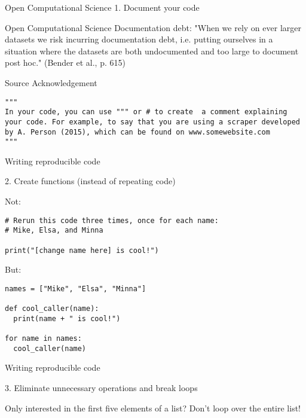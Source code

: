 \documentclass[compress]{beamer}
\begin{document}
\begin{frame}{Open Computational Science}
1. Document your code
\end{frame}

\begin{frame}{Open Computational Science}
Documentation debt: "When we rely on ever larger datasets we risk incurring documentation debt, i.e. putting ourselves in a situation where the datasets are both undocumented and too large to document post hoc." (Bender et al., p. 615)
	
\end{frame}

\begin{frame}[fragile]{Source Acknowledgement}
	
\begin{lstlisting}		
"""
In your code, you can use """ or # to create  a comment explaining your code. For example, to say that you are using a scraper developed by A. Person (2015), which can be found on www.somewebsite.com
"""
\end{lstlisting}
\end{frame}


\begin{frame}[fragile]{Writing reproducible code}
	
2. Create functions  (instead of repeating code)
	
Not:
\begin{lstlisting}		
# Rerun this code three times, once for each name:
# Mike, Elsa, and Minna
		
print("[change name here] is cool!")
\end{lstlisting}
	
But:
\begin{lstlisting}		
names = ["Mike", "Elsa", "Minna"]
		
def cool_caller(name):
  print(name + " is cool!")
		
for name in names:
  cool_caller(name)
\end{lstlisting}
	
	
\end{frame}

\begin{frame}{Writing reproducible code}
	
3. Eliminate unnecessary operations and break loops
	
Only interested in the first five elements of a list? Don't loop over the entire list!
\end{frame}
\end{document}
